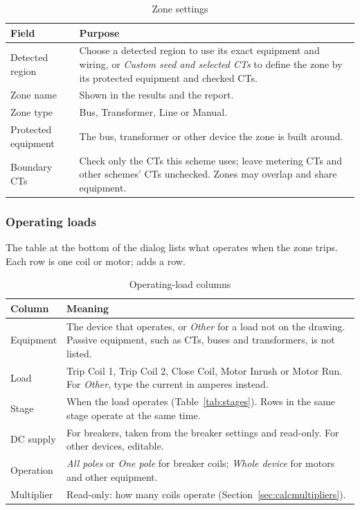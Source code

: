 \begin{table}[H]
  \centering
  \caption{Zone settings}
  \label{tab:zonesettings}
  \begin{tabularx}{\textwidth}{l L}
    \toprule
    \textbf{Field} & \textbf{Purpose} \\
    \midrule
    Detected region & Choose a detected region to use its exact equipment and wiring, or \emph{Custom seed and selected CTs} to define the zone by its protected equipment and checked CTs. \\
    Zone name & Shown in the results and the report. \\
    Zone type & Bus, Transformer, Line or Manual. \\
    Protected equipment & The bus, transformer or other device the zone is built around. \\
    Boundary CTs & Check only the CTs this scheme uses; leave metering CTs and other schemes' CTs unchecked. Zones may overlap and share equipment. \\
    \bottomrule
  \end{tabularx}
\end{table}

\subsubsection{Operating loads}

The table at the bottom of the dialog lists what operates when the zone trips. Each
row is one coil or motor;  adds a row.

\begin{table}[H]
  \centering
  \caption{Operating-load columns}
  \label{tab:loadcolumns}
  \begin{tabularx}{\textwidth}{l L}
    \toprule
    \textbf{Column} & \textbf{Meaning} \\
    \midrule
    Equipment & The device that operates, or \emph{Other} for a load not on the drawing. Passive equipment, such as CTs, buses and transformers, is not listed. \\
    Load & Trip Coil 1, Trip Coil 2, Close Coil, Motor Inrush or Motor Run. For \emph{Other}, type the current in amperes instead. \\
    Stage & When the load operates (Table~\ref{tab:stages}). Rows in the same stage operate at the same time. \\
    DC supply & For breakers, taken from the breaker settings and read-only. For other devices, editable. \\
    Operation & \emph{All poles} or \emph{One pole} for breaker coils; \emph{Whole device} for motors and other equipment. \\
    Multiplier & Read-only: how many coils operate (Section~\ref{sec:calcmultipliers}). \\
    \bottomrule
  \end{tabularx}
\end{table}

